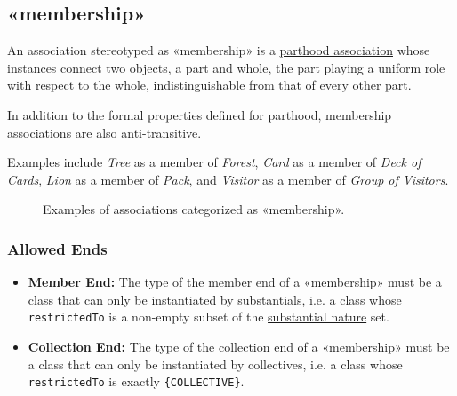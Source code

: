 

\subsection{«membership»}
\label{stereotype:membership}

An association stereotyped as «membership» is a \hyperref[stereotype:parthood]{parthood association} whose instances connect two objects, a part and whole, the part playing a uniform role with respect to the whole, indistinguishable from that of every other part.

In addition to the formal properties defined for parthood, membership associations are also anti-transitive.

Examples include \textit{Tree} as a member of \textit{Forest}, \textit{Card} as a member of \textit{Deck of Cards}, \textit{Lion} as a member of \textit{Pack}, and \textit{Visitor} as a member of \textit{Group of Visitors}.

\begin{figure}[h]
    \centering
    
    \caption{Examples of associations categorized as «membership».}
    \label{fig:membership-example}
\end{figure}


\subsubsection{Allowed Ends}

\begin{itemize}
    \item \textbf{Member End:} The type of the member end of a «membership» must be a class that can only be instantiated by substantials, i.e. a class whose  \texttt{restrictedTo} is a non-empty subset of the \hyperref[par:substantial-nature]{substantial nature} set.
    
    \item \textbf{Collection End:} The type of the collection end of a «membership» must be a class that can only be instantiated by collectives, i.e. a class whose  \texttt{restrictedTo} is exactly \texttt{\{COLLECTIVE\}}.
\end{itemize}

